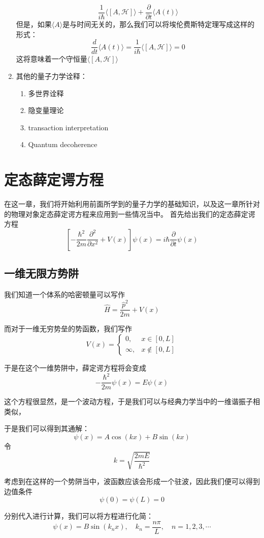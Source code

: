 \documentclass{article}
\newcommand{\expectation}[1]{\langle #1 \rangle}
\begin{document}
\begin{enumerate}
\[        \frac{1}{i\hbar}\expectation{[A,\mathcal{H}]}+\frac{\partial}{\partial t}\expectation{A(t)}
    \]
    但是，如果$\expectation{A}$是与时间无关的，那么我们可以将埃伦费斯特定理写成这样的形式：
    \[
    \frac{d}{dt}\expectation{A(t)}=
        \frac{1}{i\hbar}\expectation{[A,\mathcal{H}]}=0
    \]
    这将意味着一个守恒量$\expectation{[A,\mathcal{H}]}$
    \item 其他的量子力学诠释：
    \begin{enumerate}
    \item 多世界诠释
    \item 隐变量理论
    \item transaction interpretation
    \item Quantum decoherence
    \end{enumerate}
\end{enumerate}

\section{定态薛定谔方程}

在这一章，我们将开始利用前面所学到的量子力学的基础知识，以及这一章所针对的物理对象定态薛定谔方程来应用到一些情况当中。
首先给出我们的定态薛定谔方程
\[
\left[-\frac{\hbar^2}{2m}\frac{\partial^2}{\partial x^2} + V(x)\right]\psi(x) = i\hbar\frac{\partial}{\partial t}\psi(x)
\]
\subsection{一维无限方势阱}
我们知道一个体系的哈密顿量可以写作
\[
\hat{H}=\frac{\hat{p}^2}{2m}+V(x)
\]

而对于一维无穷势垒的势函数，我们写作
\[
    V(x)=\begin{cases}
    0,&x\in[0,L]\\ 
    \infty,&x\notin[0,L]
    \end{cases}
\]

于是在这个一维势阱中，薛定谔方程将会变成
\[
    -\frac{\hbar^2}{2m}\psi(x)=E\psi(x)
\]

这个方程很显然，是一个波动方程，于是我们可以与经典力学当中的一维谐振子相类似，

于是我们可以得到其通解：
\[
    \psi(x)=A\cos(kx)+B\sin(kx)
\]
令
\[
    k=\sqrt{\frac{2mE}{\hbar^2}}
\]

考虑到在这样的一个势阱当中，波函数应该会形成一个驻波，因此我们便可以得到边值条件
\[
    \psi(0)=\psi(L)=0
\]

分别代入进行计算，我们可以将方程进行化简：
\[
    \psi(x)=B\sin(k_nx),\quad k_n = \frac{n\pi}{L},\quad n=1,2,3,\cdots
\]
\end{document}
